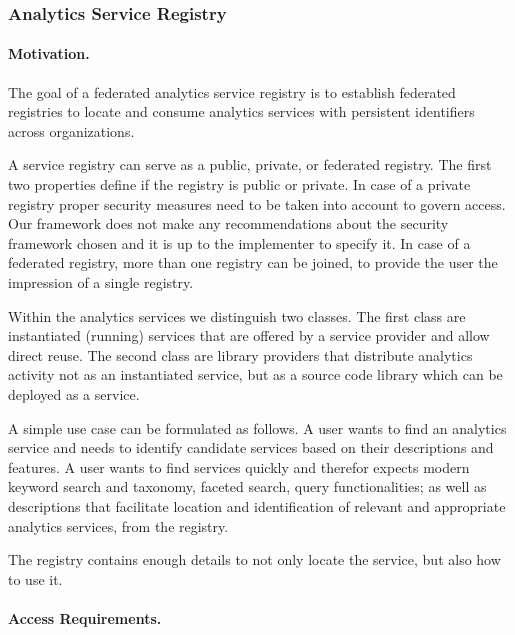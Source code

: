 
\subsubsection{Analytics Service Registry}
\label{sec:registry}

\paragraph*{Motivation.} 

The goal of a federated analytics service registry is to establish
federated registries to locate and consume analytics services with
persistent identifiers across organizations.

A service registry can serve as a public, private, or federated
registry. The first two properties define if the registry is public or
private. In case of a private registry proper security measures need
to be taken into account to govern access. Our framework does not make
any recommendations about the security framework chosen and it is up
to the implementer to specify it. In case of a federated registry,
more than one registry can be joined, to provide the user the
impression of a single registry.

Within the analytics services we distinguish two classes. The first
class are instantiated (running) services that are offered by a
service provider and allow direct reuse. The second class are library
providers that distribute analytics activity not as an instantiated
service, but as a source code library which can be deployed as a
service.


A simple use case can be formulated as follows.
A user wants to find an analytics service and needs to
identify candidate services based on their descriptions and
features. A user wants to find services quickly and therefor expects
modern keyword search and taxonomy, faceted search, query
functionalities; as well as descriptions that facilitate location and
identification of relevant and appropriate analytics services, from the
registry.

The registry contains enough details to not only locate the service,
but also how to use it.

\paragraph*{Access Requirements.} 


